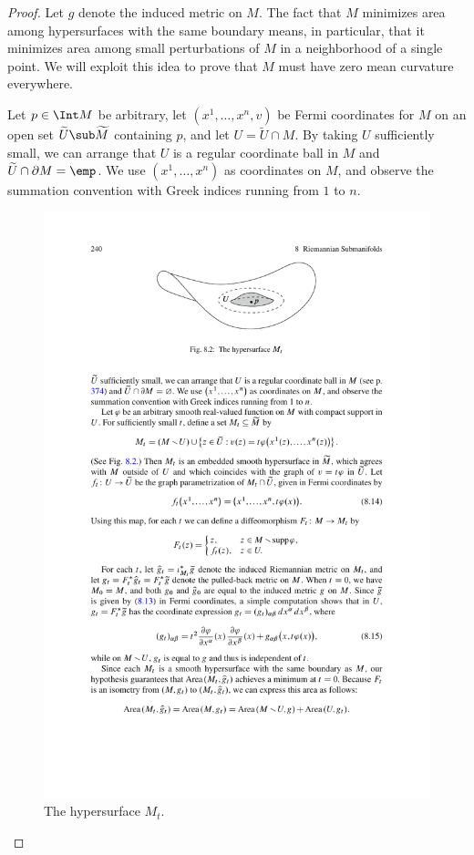 \begin{proof}
Let $g$ denote the induced metric on $M$. The fact that $M$ minimizes area among hypersurfaces with the same boundary means, in particular, that it minimizes area among 
small perturbations of $M$ in a neighborhood of a single point. We will exploit this idea to prove that $M$ must have zero mean curvature everywhere.\par
Let $p\in\Int M$ be arbitrary, let $(x^1,\dots,x^n,v)$ be Fermi coordinates for $M$ on an open set $\widetilde{U}\sub\widetilde{M}$ containing $p$, and let 
$U=\widetilde{U}\cap M$. By taking $U$ sufficiently small, we can arrange that $U$ is a regular coordinate ball in $M$ and $\widetilde{U}\cap\partial M=\emp$. We use 
$(x^1,\dots,x^n)$ as coordinates on $M$, and observe the summation convention with Greek indices running from $1$ to $n$.
\begin{figure}[htbp]
\centering
\includegraphics{pictures/minimal-surface}
\caption{The hypersurface $M_t$.}
\end{figure}


\end{proof}
